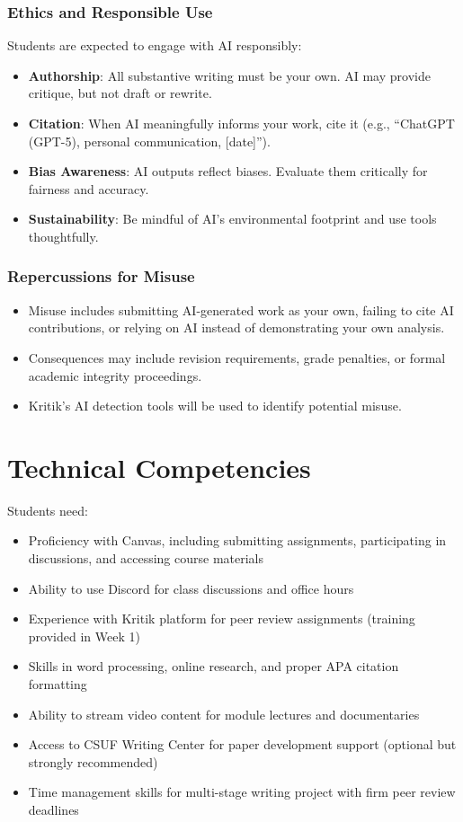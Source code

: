 \documentclass[12pt]{article}     %
\begin{document}
\subsubsection*{Ethics and Responsible Use}

\noindent Students are expected to engage with AI responsibly:

\begin{itemize}
    \item \textbf{Authorship}: All substantive writing must be your own. AI may provide critique, but not draft or rewrite.
    \item \textbf{Citation}: When AI meaningfully informs your work, cite it (e.g., ``ChatGPT (GPT-5), personal communication, [date]'').
    \item \textbf{Bias Awareness}: AI outputs reflect biases. Evaluate them critically for fairness and accuracy.
    \item \textbf{Sustainability}: Be mindful of AI's environmental footprint and use tools thoughtfully.
\end{itemize}

\subsubsection*{Repercussions for Misuse}

\begin{itemize}
    \item Misuse includes submitting AI-generated work as your own, failing to cite AI contributions, or relying on AI instead of demonstrating your own analysis.
    \item Consequences may include revision requirements, grade penalties, or formal academic integrity proceedings.
    \item Kritik's AI detection tools will be used to identify potential misuse.
\end{itemize}

\section{Technical Competencies}
Students need:
\begin{itemize}
\item Proficiency with Canvas, including submitting assignments, participating in discussions, and accessing course materials
\item Ability to use Discord for class discussions and office hours
\item Experience with Kritik platform for peer review assignments (training provided in Week 1)
\item Skills in word processing, online research, and proper APA citation formatting
\item Ability to stream video content for module lectures and documentaries
\item Access to CSUF Writing Center for paper development support (optional but strongly recommended)
\item Time management skills for multi-stage writing project with firm peer review deadlines
\end{itemize}
\end{document}
